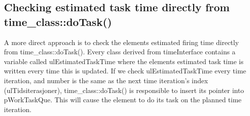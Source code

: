 
	
	
	

	\subsection{Checking estimated task time directly from time\_class::doTask()}
	A more direct approach is to check the elements estimated firing time directly from time\_class::doTask(). 
	Every class derived from timeInterface contains a variable called ulEstimatedTaskTime where the elements estimated task time is written every time this is updated.
	If we check ulEstimatedTaskTime every time iteration, and number is the same as the next time iteration's index (ulTidsiterasjoner), time\_class::doTask() is responsible to insert its pointer into pWorkTaskQue.
	This will cause the element to do its task on the planned time iteration.

